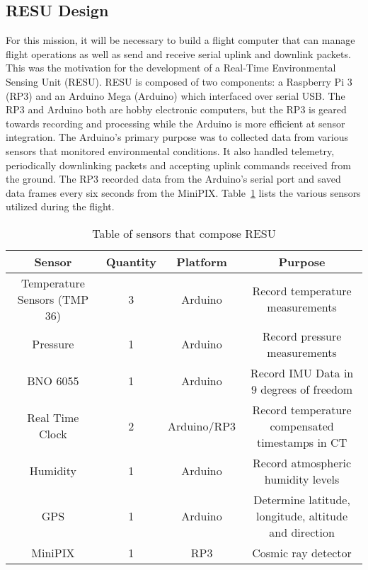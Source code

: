 \subsection{RESU Design}
\label{sec:RESU-Design}

For this mission, it will be necessary to build a flight computer that can manage flight operations as well as send and receive serial uplink and downlink packets.  This was the motivation for the development of a Real-Time Environmental Sensing Unit (RESU). RESU is composed of two components: a Raspberry Pi 3 (RP3) and an Arduino Mega (Arduino) which interfaced over serial USB.  The RP3 and Arduino both are hobby electronic computers, but the RP3 is geared towards recording and processing while the Arduino is more efficient at sensor integration.  The Arduino's primary purpose was to collected data from various sensors that monitored environmental conditions. It also handled telemetry, periodically downlinking packets and accepting uplink commands received from the ground. The RP3 recorded data from the Arduino's serial port and saved data frames every six seconds from the MiniPIX.  Table~\ref{tab:Sensors} lists the various sensors utilized during the flight.

\begin{table}[h!]
\centering
\caption{Table of sensors that compose RESU}
\label{tab:Sensors}
\bigskip
\begin{tabular}{|c|c|c|c|}
\hline
\multicolumn{1}{|c|}{\bfseries Sensor} & {\bfseries Quantity} & {\bfseries Platform} & {\bfseries Purpose} \\
\hline
    Temperature Sensors (TMP 36)	& 3 & Arduino  		& Record temperature measurements  \\ \hline
    Pressure        				& 1 & Arduino 		& Record pressure measurements \\ \hline
    BNO 6055       					& 1 & Arduino 		& Record IMU Data in 9 degrees of freedom \\ \hline    
    Real Time Clock 				& 2 & Arduino/RP3 	& Record temperature compensated timestamps in CT \\\hline
    Humidity        				& 1 & Arduino 		& Record atmospheric humidity levels \\ \hline
    GPS     						& 1 & Arduino 		& Determine latitude, longitude, altitude and direction \\ \hline
    MiniPIX         				& 1 & RP3     		& Cosmic ray detector \\ \hline
\end{tabular}
\end{table}

